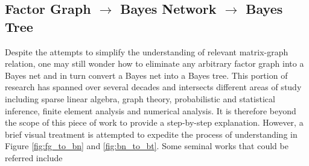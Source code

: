 \subsection{Factor Graph $\rightarrow$ Bayes Network $\rightarrow$ Bayes Tree}
\label{ss:fg_to_bn_to_bt}
Despite the attempts to simplify the understanding of relevant matrix-graph relation, one may still wonder how to eliminate any arbitrary factor graph into a Bayes net and in turn convert a Bayes net into a Bayes tree. This portion of research has spanned over several decades and intersects different areas of study including sparse linear algebra, graph theory, probabilistic and statistical inference, finite element analysis and numerical analysis. It is therefore beyond the scope of this piece of work to provide a step-by-step explanation. However, a brief visual treatment is attempted to expedite the process of understanding in Figure \ref{fig:fg_to_bn} and \ref{fig:bn_to_bt}. Some seminal works that could be referred include \cite{chordalcliqueintro, kaessbayestree, fgtobn, heggernesordering, oldchina, cowellprobabilistic}
